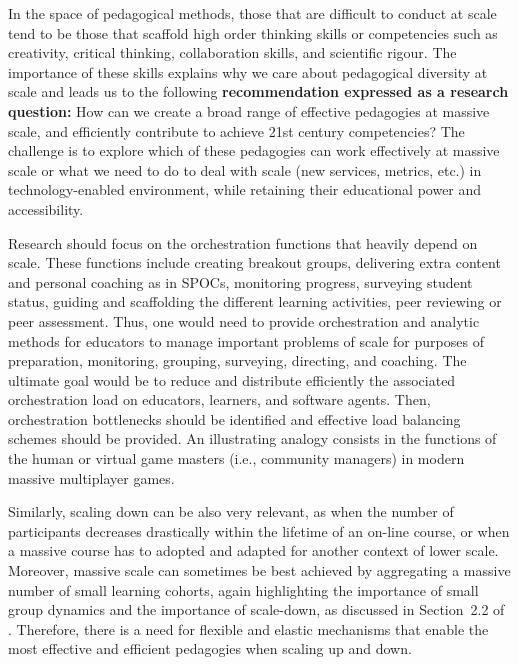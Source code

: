 

In the space of pedagogical methods, those that are difficult to conduct
at scale tend to be those that scaffold high order thinking skills or
competencies such as creativity, critical thinking, collaboration
skills, and scientific rigour.  The importance of these skills explains
why we care about pedagogical diversity at scale and leads us to the
following \textbf{recommendation expressed as a research question:} How can we
create a broad range of effective pedagogies at massive scale, and
efficiently contribute to achieve 21st century competencies? The
challenge is to explore which of these pedagogies can work effectively
at massive scale or what we need to do to deal with scale (new services,
metrics, etc.) in technology-enabled environment, while retaining their
educational power and accessibility.

Research should focus on the orchestration functions that heavily depend
on scale. These functions include creating breakout groups, delivering
extra content and personal coaching as in SPOCs, monitoring progress,
surveying student status, guiding and scaffolding the different learning
activities, peer reviewing or peer assessment. Thus, one would need to
provide orchestration and analytic methods for educators to manage
important problems of scale for purposes of preparation, monitoring,
grouping, surveying, directing, and coaching. The ultimate goal would be
to reduce and distribute efficiently the associated orchestration load
on educators, learners, and software agents. Then, orchestration
bottlenecks should be identified and effective load balancing schemes
should be provided. An illustrating analogy consists in the functions of
the human or virtual game masters (i.e., community managers) in modern
massive multiplayer games.

Similarly, scaling down can be also very relevant, as when the number of
participants decreases drastically within the lifetime of an on-line
course, or when a massive course has to adopted and adapted for another
context of lower scale. Moreover, massive scale can sometimes be best
achieved by aggregating a massive number of small learning cohorts,
again highlighting the importance of small group dynamics and the
importance of scale-down,
as discussed in Section~2.2 of \cite{mroe-2013-report}.
Therefore, there is a need for flexible and
elastic mechanisms that enable the most effective and efficient
pedagogies when scaling up and down.  

